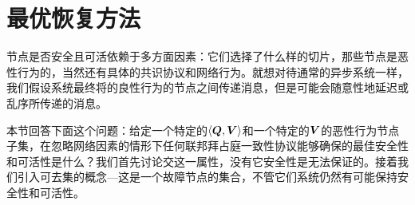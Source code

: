 \section{最优恢复方法}\label{sec:resilience}

节点是否安全且可活依赖于多方面因素：它们选择了什么样的{\quorum}切片，那些节点是恶性行为的，当然还有具体的共识协议和网络行为。就想对待通常的异步系统一样，我们假设系统最终将的良性行为的节点之间传递消息，但是可能会随意性地延迟或乱序所传递的消息。

本节回答下面这个问题：给定一个特定的$\langle{\bm Q},{\bm V}\rangle$和一个特定的${\bm V}$的恶性行为节点子集，在忽略网络因素的情形下任何联邦拜占庭一致性协议能够确保的最佳安全性和可活性是什么？我们首先讨论{\quorum}交这一属性，没有它安全性是无法保证的。接着我们引入可去集的概念---这是一个故障节点的集合，不管它们系统仍然有可能保持安全性和可活性。



